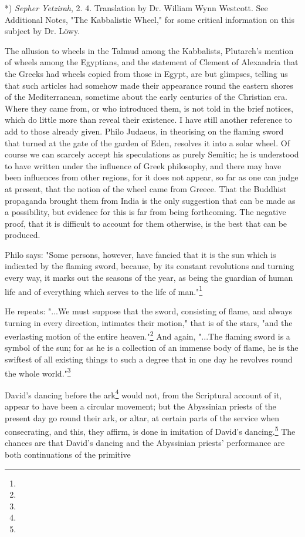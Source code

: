 \documentclass[a4paper, 11pt, oneside, polutonikogreek, english]{article}
\begin{document}
*) \emph{Sepher Yetzirah}, 2. 4. Translation by Dr. William Wynn Westcott. See Additional Notes, "The Kabbalistic Wheel," for some critical information on this subject by Dr. Löwy.

The allusion to wheels in the Talmud among the Kabbalists, Plutarch's mention of wheels among the Egyptians, and the statement of Clement of Alexandria that the Greeks had wheels copied from those in Egypt, are but glimpses, telling us that such articles had somehow made their appearance round the eastern shores of the Mediterranean, sometime about the early centuries of the Christian era. Where they came from, or who introduced them, is not told in the brief notices, which do little more than reveal their existence. I have still another reference to add to those already given. Philo Judaeus, in theorising on the flaming sword that turned at the gate of the garden of Eden, resolves it into a solar wheel. Of course we can scarcely accept his speculations as purely Semitic; he is understood to have written under the influence of Greek philosophy, and there may have been influences from other regions, for it does not appear, so far as one can judge at present, that the notion of the wheel came from Greece. That the Buddhist propaganda brought them from India is the only suggestion that can be made as a possibility, but evidence for this is far from being forthcoming. The negative proof, that it is difficult to account for them otherwise, is the best that can be produced.

Philo says: "Some persons, however, have fancied that it is the sun which is indicated by the flaming sword, because, by its constant revolutions and turning every way, it marks out the seasons of the year, as being the guardian of human life and of everything which serves to the life of man."\footnote{}

He repeats: "...We must suppose that the sword, consisting of flame, and always turning in every direction, intimates their motion," that is of the stars, "and the everlasting motion of the entire heaven."\footnote{} And again, "...The flaming sword is a symbol of the sun; for as he is a collection of an immense body of flame, he is the swiftest of all existing things to such a degree that in one day he revolves round the whole world."\footnote{}

David's dancing before the ark\footnote{} would not, from 
the Scriptural account of it, appear to have been a 
circular movement; but the Abyssinian priests of the 
present day go round their ark, or altar, at certain parts 
of the service when consecrating, and this, they affirm, 
is done in imitation of David's dancing.\footnote{} The chances 
are that David's dancing and the Abyssinian priests' 
performance are both continuations of the primitive 
\end{document}
